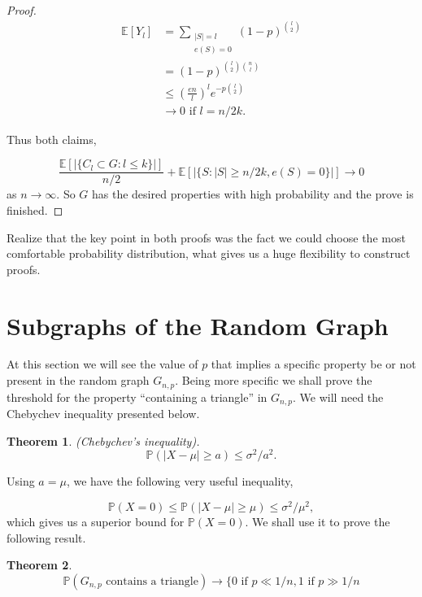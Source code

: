 \documentclass[12pt,twoside,a4paper]{book}
\numberwithin{equation}{section}
\newtheorem{theorem}             {Theorem}[section]
\theoremstyle{remark}
\begin{document}
\begin{proof}
\begin{align*}
\mathbb{E}[Y_l] &= \sum_{\substack{|S| = l \\ e(S) = 0 }} (1-p)^{\binom{l}{2}}\\
	       &= (1-p)^{\binom{l}{2} \binom{n}{l}} \\
	       &\leq \left(\frac{en}{l}\right)^l e^{-p\binom{l}{2}}\\
	       &\rightarrow 0  \text{ if } l = n/2k.
\end{align*}

Thus both claims,

$$\frac{\mathbb{E}[|\{C_l \subset G : l\leq k \}|]}{n/2} + \mathbb{E} [|\{ S:|S| \geq n/2k, e(S) = 0\}|] \rightarrow 0$$
as $n \rightarrow \infty $. So $G$ has the desired properties with high probability and the prove is finished.
\end{proof}

Realize that the key point in both proofs was the fact we could choose the most comfortable probability distribution, what gives us a huge flexibility to construct proofs.

\section{Subgraphs of the Random Graph}

At this section we will see the value of $p$ that implies a specific property be or not present in the random graph $G_{n,p}$. Being more specific we shall prove the threshold for the property ``containing a triangle'' in $G_{n,p}$.  We will need the Chebychev inequality presented below.

\begin{theorem}(Chebychev's inequality).\\
$$\mathbb{P}(|X-\mu| \geq a) \leq \sigma^2/a^2.$$
\end{theorem} 

Using $a = \mu$, we have the following very useful inequality,

$$\mathbb{P}(X=0) \leq \mathbb{P}(|X-\mu | \geq \mu) \leq \sigma^2/\mu^2,$$
which gives us a superior bound for $\mathbb{P}(X=0)$. We shall use it to prove the following result.\\

\begin{theorem}
$$ \mathbb{P}(G_{n,p}\text{ contains a triangle}) \rightarrow \big\{ 0 \text{ if } p \ll 1/n, 1 \text{ if } p \gg 1/n $$
\end{theorem}
\end{document}
